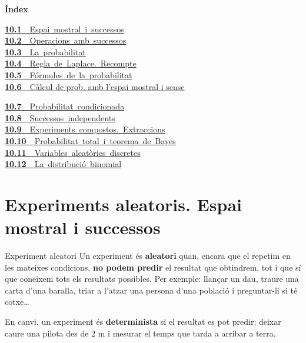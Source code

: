 \documentclass[11pt,a4paper]{article}
\begin{document}
\begin{tcolorbox}[colback=fmsurface,colframe=fmsurface,arc=3mm,left=4mm,right=4mm,top=2mm,bottom=2mm]
\small\textbf{Índex}\par\smallskip
\begin{minipage}[t]{0.49\linewidth}\small \mbox{\hyperlink{sec1}{\textbf{\color{fmgreen}10.1}\ \ Espai mostral i successos}}\\[3pt]
\mbox{\hyperlink{sec2}{\textbf{\color{fmgreen}10.2}\ \ Operacions amb successos}}\\[3pt]
\mbox{\hyperlink{sec3}{\textbf{\color{fmgreen}10.3}\ \ La probabilitat}}\\[3pt]
\mbox{\hyperlink{sec4}{\textbf{\color{fmgreen}10.4}\ \ Regla de Laplace. Recompte}}\\[3pt]
\mbox{\hyperlink{sec5}{\textbf{\color{fmgreen}10.5}\ \ Fórmules de la probabilitat}}\\[3pt]
\hyperlink{sec6}{\textbf{\color{fmgreen}10.6}\ \ Càlcul de prob. amb l'espai mostral i sense}\\[3pt]\end{minipage}\hfill\begin{minipage}[t]{0.49\linewidth}\small \mbox{\hyperlink{sec7}{\textbf{\color{fmgreen}10.7}\ \ Probabilitat condicionada}}\\[3pt]
\mbox{\hyperlink{sec8}{\textbf{\color{fmgreen}10.8}\ \ Successos independents}}\\[3pt]
\mbox{\hyperlink{sec9}{\textbf{\color{fmgreen}10.9}\ \ Experiments compostos. Extraccions}}\\[3pt]
\mbox{\hyperlink{sec10}{\textbf{\color{fmgreen}10.10}\ \ Probabilitat total i teorema de Bayes}}\\[3pt]
\mbox{\hyperlink{sec11}{\textbf{\color{fmgreen}10.11}\ \ Variables aleatòries discretes}}\\[3pt]
\mbox{\hyperlink{sec12}{\textbf{\color{fmgreen}10.12}\ \ La distribució binomial}}\\[3pt]\end{minipage}
\end{tcolorbox}

\section{Experiments aleatoris. Espai mostral i successos}\hypertarget{sec1}{}

\begin{fmdef}{Experiment aleatori}
Un experiment és \textbf{aleatori} quan, encara que el repetim en les mateixes condicions, \textbf{no podem predir} el resultat que obtindrem, tot i que sí que coneixem tots els resultats possibles. Per exemple: llançar un dau, traure una carta d'una baralla, triar a l'atzar una persona d'una població i preguntar-li si té cotxe\dots{}

En canvi, un experiment és \textbf{determinista} si el resultat es pot predir: deixar caure una pilota des de 2 m i mesurar el temps que tarda a arribar a terra.
\end{fmdef}
\end{document}

